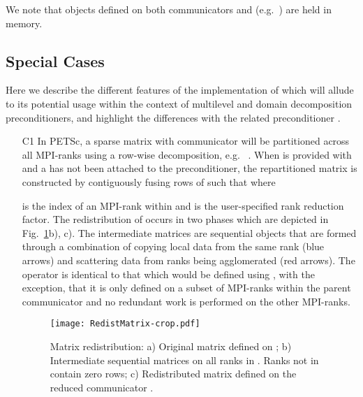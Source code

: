 \documentclass[]{siamart0216}
\begin{document}
We note that objects defined on both communicators  and  (e.g.~) are held in memory.

\subsection{Special Cases}
Here we describe the different features of the implementation of  which will allude
to its potential usage within the context of multilevel and domain decomposition preconditioners, and highlight
the differences with the related preconditioner .
\begin{itemize}
\setlength\itemsep{0em}
\item[C1] In PETSc, a sparse matrix with communicator  will be partitioned across 
	all MPI-ranks using a row-wise decomposition, e.g.~
	.
	When  is provided with  and a  has not been 
	attached to the preconditioner, the repartitioned matrix  is constructed by 
	contiguously fusing rows of  such that
	 where
	 
	 is the index of an MPI-rank within  and  is the user-specified rank reduction factor.
The redistribution of  occurs in two phases which are depicted in Fig.~\ref{fig:matredist}b), c).	
	The intermediate matrices  are sequential objects that are formed through a combination of copying 
	local data from the same rank (blue arrows) and scattering data from ranks being agglomerated (red arrows).
The operator  is identical to that which would be defined using , 
	with the exception, that it is only defined on a subset of MPI-ranks within the parent communicator 
	and no redundant work is performed on the other MPI-ranks.
\begin{figure}[h!]
\centering
\texttt{[image: RedistMatrix-crop.pdf]}
\caption{Matrix redistribution: a) Original matrix defined on ; b) Intermediate sequential matrices on all ranks in . Ranks not in  contain zero rows; c) Redistributed matrix defined on the reduced communicator . \label{fig:matredist}}
\end{figure}


\end{itemize}
\end{document}
